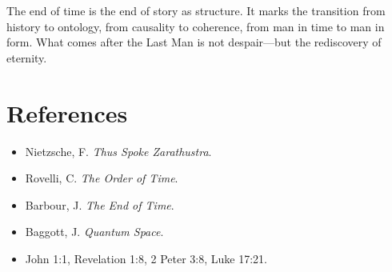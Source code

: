 \documentclass[12pt]{article}
\begin{document}
The end of time is the end of story as structure. It marks the transition from history to ontology, from causality to coherence, from man in time to man in form. What comes after the Last Man is not despair—but the rediscovery of eternity.

\section*{References}
\begin{itemize}
  \item Nietzsche, F. \textit{Thus Spoke Zarathustra}.
  \item Rovelli, C. \textit{The Order of Time}.
  \item Barbour, J. \textit{The End of Time}.
  \item Baggott, J. \textit{Quantum Space}.
  \item John 1:1, Revelation 1:8, 2 Peter 3:8, Luke 17:21.
\end{itemize}
\end{document}
